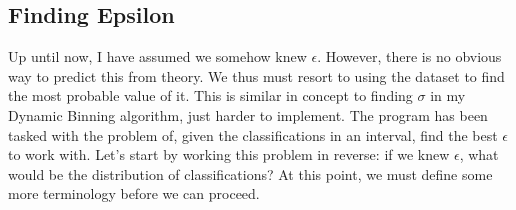 \documentclass[twocolumn]{article}
\begin{document}
\subsection{Finding Epsilon}
\indent \indent Up until now, I have assumed we somehow knew $ \epsilon $. However, there is no obvious way to predict this from theory. We thus must resort to using the dataset to find the most probable value of it. This is similar in concept to finding $ \sigma $ in my Dynamic Binning algorithm, just harder to implement. 
\newline
\indent The program has been tasked with the problem of, given the classifications in an interval, find the best $ \epsilon $ to work with. Let's start by working this problem in reverse: if we knew $ \epsilon $, what would be the distribution of classifications? At this point, we must define some more terminology before we can proceed. 
\end{document}
